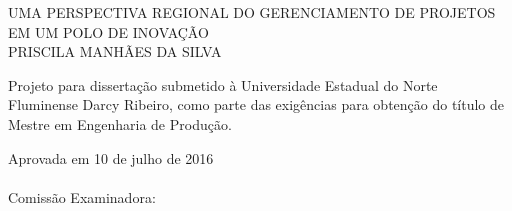\begin{folhadeaprovacao}
    \setlength{\ABNTsignthickness}{0.4pt}
    \setlength{\ABNTsignwidth}{15cm}
    \setlength{\ABNTsignskip}{0.9cm}
    \begin{center}
       {\large UMA PERSPECTIVA REGIONAL DO GERENCIAMENTO DE PROJETOS EM UM POLO DE INOVAÇÃO} \\ [3.5cm]
       {\large PRISCILA MANHÃES DA SILVA} \\ [1.5cm]
        \hspace{.45\textwidth} %
        \begin{minipage}{0.5\textwidth}
        \begin{espacosimples}
        Projeto para dissertação submetido à Universidade Estadual do Norte Fluminense Darcy Ribeiro, como parte das exigências para obtenção do título de Mestre em Engenharia de Produção.
        \end{espacosimples}
        \end{minipage}
    \end{center}
    {\normalsize Aprovada em 10 de julho de 2016} \\\\
    {\normalsize Comissão Examinadora: }
    \bigbreak
    \bigbreak
    \bigbreak
    \bigbreak
\end{folhadeaprovacao}
